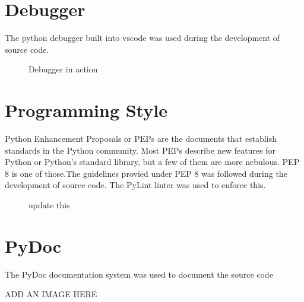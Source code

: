   \section{Debugger}
    The python debugger built into vscode was used during the development of source code.
    \begin{figure}[h!]
      \centering
      \caption{Debugger in action}
      \label{fig:Debugger}
    \end{figure}

  \section{Programming Style}
  Python Enhancement Proposals or PEPs are the documents that establish standards in the Python community. Most PEPs describe new features for Python or Python's standard library, but a few of them are more nebulous. PEP 8 is one of those\cite{python}.The guidelines provied under PEP 8 was followed during the development of source code. The PyLint linter was used to enforce this. 
    \begin{figure}[h!]
      \centering
      \caption{update this}
      \label{fig:linter}
    \end{figure}

  \section{PyDoc}
    The PyDoc documentation system was used to document the source code
    
    ADD AN IMAGE HERE


